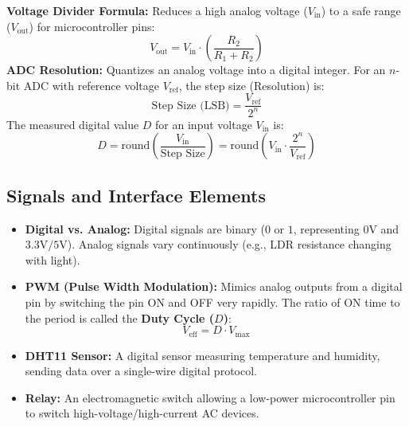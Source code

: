 \documentclass[12pt,a4paper]{article}
\begin{document}
\begin{tcolorbox}[formulabox, title={Voltage Dividers and Analog-to-Digital Conversion (ADC)}]
  \textbf{Voltage Divider Formula:} Reduces a high analog voltage ($V_{\text{in}}$) to a safe range ($V_{\text{out}}$) for microcontroller pins:
  \begin{equation}
    V_{\text{out}} = V_{\text{in}} \cdot \left( \frac{R_2}{R_1 + R_2} \right)
  \end{equation}
  \textbf{ADC Resolution:} Quantizes an analog voltage into a digital integer. For an $n$-bit ADC with reference voltage $V_{\text{ref}}$, the step size (Resolution) is:
  \begin{equation}
    \text{Step Size (LSB)} = \frac{V_{\text{ref}}}{2^n}
  \end{equation}
  The measured digital value $D$ for an input voltage $V_{\text{in}}$ is:
  \begin{equation}
    D = \text{round}\left( \frac{V_{\text{in}}}{\text{Step Size}} \right) = \text{round}\left( V_{\text{in}} \cdot \frac{2^n}{V_{\text{ref}}} \right)
  \end{equation}
\end{tcolorbox}

\subsection{Signals and Interface Elements}
\begin{itemize}[leftmargin=*, itemsep=3.5pt]
  \item \textbf{Digital vs. Analog:} Digital signals are binary ($0$ or $1$, representing $0\text{V}$ and $3.3\text{V}/5\text{V}$). Analog signals vary continuously (e.g., LDR resistance changing with light).
  \item \textbf{PWM (Pulse Width Modulation):} Mimics analog outputs from a digital pin by switching the pin ON and OFF very rapidly. The ratio of ON time to the period is called the \textbf{Duty Cycle ($D$)}:
        \begin{equation}
          V_{\text{eff}} = D \cdot V_{\text{max}}
        \end{equation}
  \item \textbf{DHT11 Sensor:} A digital sensor measuring temperature and humidity, sending data over a single-wire digital protocol.
  \item \textbf{Relay:} An electromagnetic switch allowing a low-power microcontroller pin to switch high-voltage/high-current AC devices.
\end{itemize}
\end{document}
